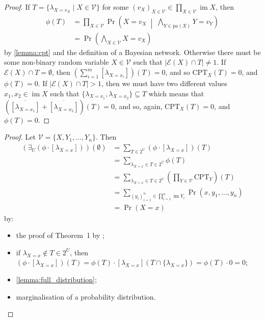 \documentclass{uai2021} %
\theoremstyle{definition}
\DeclareMathOperator{\im}{im}
\begin{document}
\fulldistribution*
\begin{proof}
  If $T = \{ \lambda_{X=v_X} \mid X \in \mathcal{V} \}$ for some $(v_X)_{X
    \in \mathcal{V}} \in \prod_{X \in \mathcal{V}} \im X$, then
  \begin{align*}
    \phi(T) &= \prod_{X \in \mathcal{V}} \Pr \left( X=v_X \;\middle|\; \bigwedge_{Y \in \mathrm{pa}(X)} Y=v_Y \right) \\
            &= \Pr \left( \bigwedge_{X \in \mathcal{V}} X=v_X \right)
  \end{align*}
  by \cref{lemma:cpt} and the definition of a Bayesian network. Otherwise there
  must be some non-binary random variable $X \in \mathcal{V}$ such that
  $|\mathcal{E}(X) \cap T| \ne 1$. If $\mathcal{E}(X) \cap T = \emptyset$, then
  $\left( \sum_{i=1}^m [\lambda_{X = x_i}] \right)(T) = 0$, and so
  $\mathrm{CPT}_X(T) = 0$, and $\phi(T) = 0$. If $|\mathcal{E}(X) \cap T| > 1$,
  then we must have two different values $x_1, x_2 \in \im X$ such that
  $\{\lambda_{X=x_1}, \lambda_{X=x_2} \} \subseteq T$ which means that
  $(\overline{[\lambda_{X=x_1}]} + \overline{[\lambda_{X=x_2}]})(T) = 0$, and
  so, again, $\mathrm{CPT}_X(T) = 0$, and $\phi(T) = 0$.
\end{proof}

\correctness*
\begin{proof}
  Let $\mathcal{V} = \{ X, Y_1, \dots, Y_n \}$. Then
  \begin{align*}
    (\exists_U (\phi \cdot [\lambda_{X=x}]))(\emptyset) &= \sum_{T \in 2^U} (\phi \cdot [\lambda_{X=x}])(T) \\
                                                        &= \sum_{\lambda_{X=x} \in T \in 2^U} \phi(T) \\
                                                        &= \sum_{\lambda_{X=x} \in T \in 2^U} \left( \prod_{Y \in \mathcal{V}} \mathrm{CPT}_Y \right)(T) \\
                                                        &= \sum_{(y_i)_{i=1}^n \in \prod_{i=1}^n \im Y_i} \Pr(x, y_1, \dots, y_n) \\
                                                        &= \Pr(X = x)
  \end{align*}
  by:
  \begin{itemize}
  \item the proof of Theorem~1 by \citet{DBLP:conf/aaai/DudekPV20};
  \item if $\lambda_{X=x} \not\in T \in 2^U$, then $(\phi \cdot
    [\lambda_{X=x}])(T) = \phi(T) \cdot [\lambda_{X=x}](T \cap \{
    \lambda_{X=x} \}) = \phi(T) \cdot 0 = 0$;
  \item \cref{lemma:full_distribution};
  \item marginalisation of a probability distribution.
  \end{itemize}
\end{proof}

\end{document}
